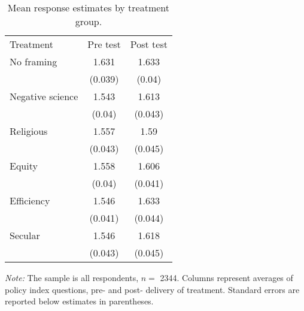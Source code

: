 \begin{table}[H]
\centering
\caption{\label{tab:unnamed-chunk-6}Mean response estimates by treatment group. \label{tab:means}}
\centering
\begin{threeparttable}
\begin{tabular}[t]{lcc}
\toprule
Treatment & Pre test & Post test\\
\cmidrule(lr){2-3}
No framing & \num{1.631} & \num{1.633}\\
 & (\num{0.039}) & (\num{0.04})\\
\addlinespace
Negative science & \num{1.543} & \num{1.613}\\
 & (\num{0.04}) & (\num{0.043})\\
\addlinespace
Religious & \num{1.557} & \num{1.59}\\
 & (\num{0.043}) & (\num{0.045})\\
\addlinespace
Equity & \num{1.558} & \num{1.606}\\
 & (\num{0.04}) & (\num{0.041})\\
\addlinespace
Efficiency & \num{1.546} & \num{1.633}\\
 & (\num{0.041}) & (\num{0.044})\\
\addlinespace
Secular & \num{1.546} & \num{1.618}\\
 & (\num{0.043}) & (\num{0.045})\\
\bottomrule
\end{tabular}
\begin{tablenotes}
\item \footnotesize \textit{Note:} The sample is all respondents, $n = $ \num{2344}. Columns represent  averages of policy index questions, pre- and post- delivery of treatment. Standard errors are reported below estimates in parentheses.
\end{tablenotes}
\end{threeparttable}
\end{table}
